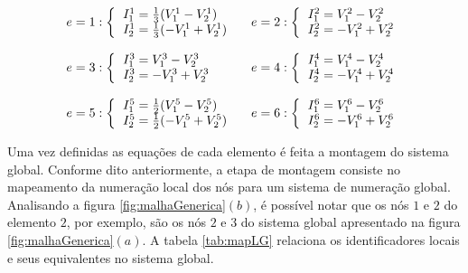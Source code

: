 \documentclass[
    12pt,               %
    openright,          %
    oneside,
    a4paper,            %
    english,            %
    french,             %
    spanish,            %
    brazil              %
    ]{abntex2}
\begin{document}
\begin{apendicesenv}
\begin{equation}
\label{eq:ohmMalha}
\begin{tabular}{l l}
$
e = 1:
\left \{
\begin{tabular}{l}
$I_1^1 = \frac{1}{3} (V_1^1 - V_2^1)$ \\
$I_2^1 = \frac{1}{3} (-V_1^1 + V_2^1)$
\end{tabular}       
\right .       
$
&
$
e = 2:
\left \{
\begin{tabular}{l}
$I_1^2 = V_1^2 - V_2^2$ \\
$I_2^2 = -V_1^2 + V_2^2$
\end{tabular}       
\right .       
$
\\ \\
$
e = 3:
\left \{
\begin{tabular}{l}
$I_1^3 = V_1^3 - V_2^3$ \\
$I_2^3 = -V_1^3 + V_2^3$
\end{tabular}       
\right .       
$
&
$
e = 4:
\left \{
\begin{tabular}{l}
$I_1^4 = V_1^4 - V_2^4$ \\
$I_2^4 = -V_1^4 + V_2^4$
\end{tabular}       
\right .       
$
\\ \\
$
e = 5:
\left \{
\begin{tabular}{l}
$I_1^5 = \frac{1}{2} (V_1^5 - V_2^5)$ \\
$I_2^5 = \frac{1}{2} (-V_1^5 + V_2^5)$
\end{tabular}       
\right .       
$
&
$
e = 6:
\left \{
\begin{tabular}{l}
$I_1^6 = V_1^6 - V_2^6$ \\
$I_2^6 = -V_1^6 + V_2^6$
\end{tabular}       
\right .       
$                    
\end{tabular}               
\end{equation}

Uma vez definidas as equações de cada elemento é feita a montagem do sistema global. Conforme dito anteriormente, a etapa de montagem consiste no mapeamento da numeração local dos nós para um sistema de numeração global. Analisando a figura \ref{fig:malhaGenerica}$(b)$, é possível notar que os nós $1$ e $2$ do elemento $2$, por exemplo, são os nós $2$ e $3$ do sistema global apresentado na figura \ref{fig:malhaGenerica}$(a)$. A tabela \ref{tab:mapLG} relaciona os identificadores locais e seus equivalentes no sistema global.


\end{apendicesenv}
\end{document}

